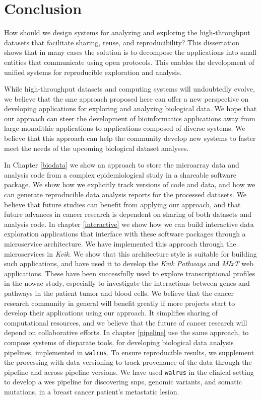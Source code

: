 \chapter{Conclusion}
How should we design systems for analyzing and exploring the high-throughput
datasets that facilitate sharing, reuse, and reproducibility? This dissertation
shows that in many cases the solution is to decompose the applications into
small entities that communicate using open protocols. This enables the
development of unified systems for reproducible exploration and analysis. 

While high-throughput datasets and computing systems will undoubtedly evolve, we
believe that the \gls{sme} approach proposed here can offer a new perspective on
developing applications for exploring and analyzing biological data. We hope
that our approach can steer the development of bioinformatics applications away
from large monolithic applications to applications composed of diverse systems.
We believe that this approach can help the community develop new systems to
faster meet the needs of the upcoming biological dataset analyses. 

In Chapter \ref{biodata} we show an approach to store the microarray data and
analysis code from a complex epidemiological study in a shareable software
package. We show how we explicitly track versions of code and data, and how we
can generate reproducible data analysis reports for the processed datasets.
We believe that future studies can benefit from applying our approach, and that
future advances in cancer research is dependent on sharing of both datasets and
analysis code. 
In chapter \ref{interactive} we show how we can build
interactive data exploration applications that interface with these software
packages through a microservice architecture. We have implemented this approach
through the microservices in \emph{Kvik}. We show that this architecture style
is suitable for building such applications, and have used it to develop the
\emph{Kvik Pathways} and \emph{MIxT} web applications. These have been
successfully used to explore transcriptional profiles in the \gls{nowac} study,
especially to investigate the interactions between genes and pathways in the
patient tumor and blood cells. 
We believe that the cancer research community in general will benefit greatly if more
projects start to develop their applications using our approach. It simplifies
sharing of computational resources, and we believe that the future of cancer
research will depend on collaborative efforts. 
In chapter \ref{pipeline} use the same approach, to compose systems of disparate
tools, for developing biological data
analysis pipelines, implemented in \texttt{walrus}. 
To ensure reproducible results, we supplement the processing
with data versioning to track provenance of the data through the pipeline and
across pipeline versions. We have used \texttt{walrus} in the clinical setting
to develop a \gls{wes} pipeline for discovering \glspl{snp}, genomic
variants, and somatic mutations, in a breast cancer patient's metastatic
lesion. 

